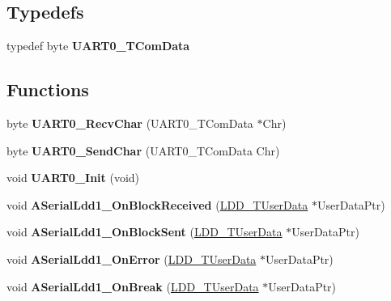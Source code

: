 \subsection*{Typedefs}
\begin{DoxyCompactItemize}
\item 
\mbox{\label{group___u_a_r_t0__module_gacd782e2dc6312c87c12b3eb9e966b229}} 
typedef byte {\bfseries U\+A\+R\+T0\+\_\+\+T\+Com\+Data}
\end{DoxyCompactItemize}
\subsection*{Functions}
\begin{DoxyCompactItemize}
\item 
\mbox{\label{group___u_a_r_t0__module_gacbbc9d1ab130fc5b01928904ff3caa8e}} 
byte {\bfseries U\+A\+R\+T0\+\_\+\+Recv\+Char} (U\+A\+R\+T0\+\_\+\+T\+Com\+Data $\ast$Chr)
\item 
\mbox{\label{group___u_a_r_t0__module_ga88232d04e79bfd462fda0671559e1294}} 
byte {\bfseries U\+A\+R\+T0\+\_\+\+Send\+Char} (U\+A\+R\+T0\+\_\+\+T\+Com\+Data Chr)
\item 
\mbox{\label{group___u_a_r_t0__module_ga69350c8eda537c8519bf9a556b579c47}} 
void {\bfseries U\+A\+R\+T0\+\_\+\+Init} (void)
\item 
\mbox{\label{group___u_a_r_t0__module_ga617597f21766b4f72d7f2883c21e6dd8}} 
void {\bfseries A\+Serial\+Ldd1\+\_\+\+On\+Block\+Received} (\hyperlink{group___p_e___types__module_ga0b66a73f87238a782318aa0be7578e35}{L\+D\+D\+\_\+\+T\+User\+Data} $\ast$User\+Data\+Ptr)
\item 
\mbox{\label{group___u_a_r_t0__module_ga5b8a51aef1d1fede97ee58e31c945b78}} 
void {\bfseries A\+Serial\+Ldd1\+\_\+\+On\+Block\+Sent} (\hyperlink{group___p_e___types__module_ga0b66a73f87238a782318aa0be7578e35}{L\+D\+D\+\_\+\+T\+User\+Data} $\ast$User\+Data\+Ptr)
\item 
\mbox{\label{group___u_a_r_t0__module_gab11d6ff796e37ab8d6c35dd8cc258f9a}} 
void {\bfseries A\+Serial\+Ldd1\+\_\+\+On\+Error} (\hyperlink{group___p_e___types__module_ga0b66a73f87238a782318aa0be7578e35}{L\+D\+D\+\_\+\+T\+User\+Data} $\ast$User\+Data\+Ptr)
\item 
\mbox{\label{group___u_a_r_t0__module_gaff0fe796ad334f68b2a86273f5ade786}} 
void {\bfseries A\+Serial\+Ldd1\+\_\+\+On\+Break} (\hyperlink{group___p_e___types__module_ga0b66a73f87238a782318aa0be7578e35}{L\+D\+D\+\_\+\+T\+User\+Data} $\ast$User\+Data\+Ptr)
\end{DoxyCompactItemize}
